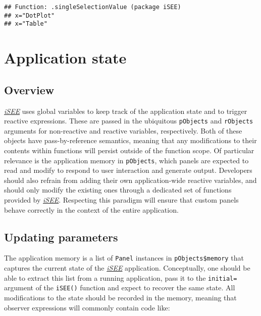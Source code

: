 \documentclass[
]{book}
\begin{document}
\begin{verbatim}
## Function: .singleSelectionValue (package iSEE)
## x="DotPlot"
## x="Table"
\end{verbatim}

\hypertarget{server}{%
\chapter{Application state}\label{server}}

\hypertarget{overview}{%
\section{Overview}\label{overview}}

\emph{\href{https://bioconductor.org/packages/3.11/iSEE}{iSEE}} uses global variables to keep track of the application state and to trigger reactive expressions.
These are passed in the ubiquitous \texttt{pObjects} and \texttt{rObjects} arguments for non-reactive and reactive variables, respectively.
Both of these objects have pass-by-reference semantics, meaning that any modifications to their contents within functions will persist outside of the function scope.
Of particular relevance is the application memory in \texttt{pObjects}, which panels are expected to read and modify to respond to user interaction and generate output.
Developers should also refrain from adding their own application-wide reactive variables, and should only modify the existing ones through a dedicated set of functions provided by \emph{\href{https://bioconductor.org/packages/3.11/iSEE}{iSEE}}.
Respecting this paradigm will ensure that custom panels behave correctly in the context of the entire application.

\hypertarget{updating-parameters}{%
\section{Updating parameters}\label{updating-parameters}}

The application memory is a list of \texttt{Panel} instances in \texttt{pObjects\$memory} that captures the current state of the \emph{\href{https://bioconductor.org/packages/3.11/iSEE}{iSEE}} application.
Conceptually, one should be able to extract this list from a running application, pass it to the \texttt{initial=} argument of the \texttt{iSEE()} function and expect to recover the same state.
All modifications to the state should be recorded in the memory, meaning that observer expressions will commonly contain code like:
\end{document}
